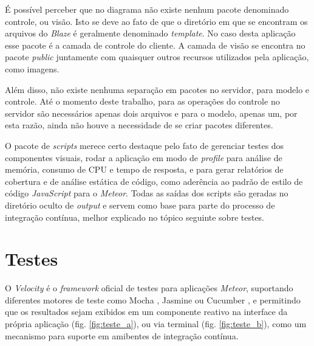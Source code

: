 É possível perceber que no diagrama não existe nenhum pacote denominado controle, ou visão. Isto se deve ao fato de que o diretório em que se encontram os arquivos do \textit{Blaze} é geralmente denominado \textit{template}. No caso desta aplicação esse pacote é a camada de controle do cliente. A camada de visão se encontra no pacote \textit{public} juntamente com quaisquer outros recursos utilizados pela aplicação, como imagens.

Além disso, não existe nenhuma separação em pacotes no servidor, para modelo e controle. Até o momento deste trabalho, para as operações do controle no servidor são necessários apenas dois arquivos e para o modelo, apenas um, por esta razão, ainda não houve a necessidade de se criar pacotes diferentes.

O pacote de \textit{scripts} merece certo destaque pelo fato de gerenciar testes dos componentes visuais, rodar a aplicação em modo de \textit{profile} para análise de memória, consumo de CPU e tempo de resposta, e para gerar relatórios de cobertura e de análise estática de código, como aderência ao padrão de estilo de código \textit{JavaScript} para o \textit{Meteor}. Todas as saídas dos scripts são geradas no diretório oculto de \textit{output} e servem como base para parte do processo de integração contínua, melhor explicado no tópico seguinte sobre testes. 


\section{Testes}

O \textit{Velocity} é o \textit{framework} oficial de testes para aplicações \textit{Meteor}, suportando diferentes motores de teste como Mocha \cite{mocha2015}, Jasmine \cite{jasmine2015} ou Cucumber \cite{cucumber2015}, e permitindo que os resultados sejam exibidos em um componente reativo na interface da própria aplicação (fig. \ref{fig:teste_a}), ou via terminal (fig. \ref{fig:teste_b}), como um mecanismo para suporte em amibentes de integração contínua.

